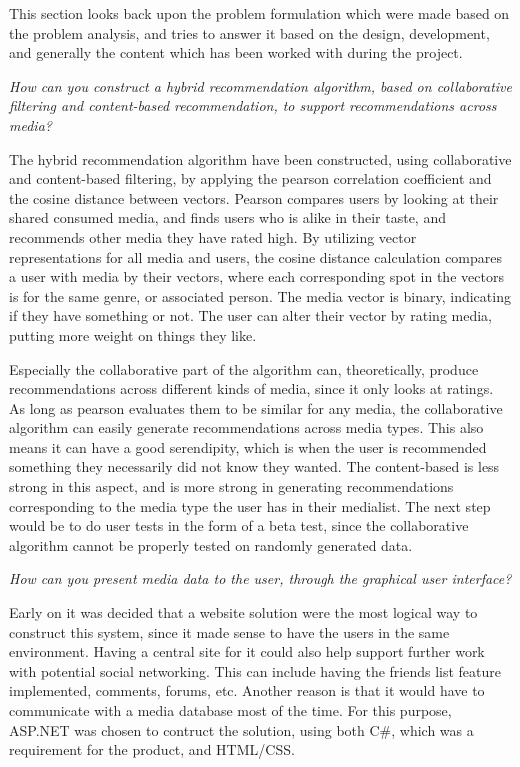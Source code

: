 This section looks back upon the problem formulation which were made based on the problem analysis, and tries to answer it based on the design, development, and generally the content which has been worked with during the project.

\textit{How can you construct a hybrid recommendation algorithm, based on collaborative filtering and content-based recommendation, to support recommendations across media?}

The hybrid recommendation algorithm have been constructed, using collaborative and content-based filtering, by applying the pearson correlation coefficient and the cosine distance between vectors. Pearson compares users by looking at their shared consumed media, and finds users who is alike in their taste, and recommends other media they have rated high. By utilizing vector representations for all media and users, the cosine distance calculation compares a user with media by their vectors, where each corresponding spot in the vectors is for the same genre, or associated person. The media vector is binary, indicating if they have something or not. The user can alter their vector by rating media, putting more weight on things they like.

Especially the collaborative part of the algorithm can, theoretically, produce recommendations across different kinds of media, since it only looks at ratings. As long as pearson evaluates them to be similar for any media, the collaborative algorithm can easily generate recommendations across media types. This also means it can have a good serendipity, which is when the user is recommended something they necessarily did not know they wanted. The content-based is less strong in this aspect, and is more strong in generating recommendations corresponding to the media type the user has in their medialist. The next step would be to do user tests in the form of a beta test, since the collaborative algorithm cannot be properly tested on randomly generated data.

\textit{How can you present media data to the user, through the graphical user interface?}

Early on it was decided that a website solution were the most logical way to construct this system, since it made sense to have the users in the same environment. Having a central site for it could also help support further work with potential social networking. This can include having the friends list feature implemented, comments, forums, etc. Another reason is that it would have to communicate with a media database most of the time. For this purpose, ASP.NET was chosen to contruct the solution, using both C\#, which was a requirement for the product, and HTML/CSS. 

